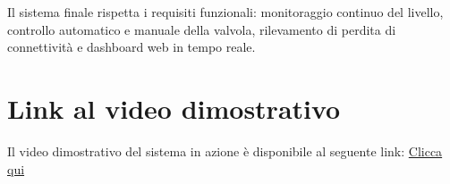 \documentclass[12pt, a4paper]{article}
\begin{document}
Il sistema finale rispetta i requisiti funzionali: monitoraggio continuo del livello, controllo automatico e manuale della valvola, rilevamento di perdita di connettività e dashboard web in tempo reale.


\section{Link al video dimostrativo}
Il video dimostrativo del sistema in azione è disponibile al seguente link: \href{https://liveunibo-my.sharepoint.com/:v:/g/personal/giuseppe_cattolico_studio_unibo_it/IQBa6F1gB55XSLYPmsERKnfZAb7FWOWHKEoVaHiGJA5QiC4?nav=eyJyZWZlcnJhbEluZm8iOnsicmVmZXJyYWxBcHAiOiJPbmVEcml2ZUZvckJ1c2luZXNzIiwicmVmZXJyYWxBcHBQbGF0Zm9ybSI6IldlYiIsInJlZmVycmFsTW9kZSI6InZpZXciLCJyZWZlcnJhbFZpZXciOiJNeUZpbGVzTGlua0NvcHkifX0&e=65CfIX}{Clicca qui }
\end{document}
